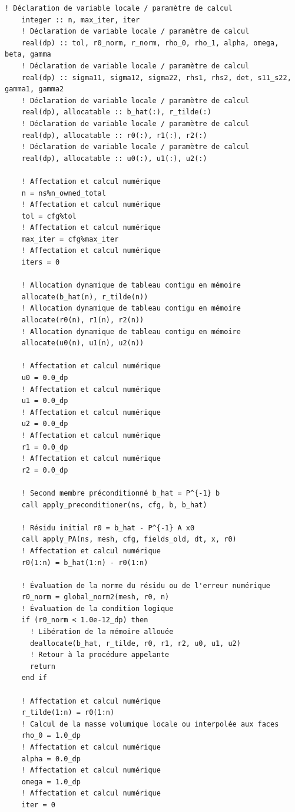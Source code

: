 \documentclass[10pt,a4paper,oneside]{book}
\begin{document}
\begin{lstlisting}[language={[95]Fortran}]
    ! Déclaration de variable locale / paramètre de calcul
    integer :: n, max_iter, iter
    ! Déclaration de variable locale / paramètre de calcul
    real(dp) :: tol, r0_norm, r_norm, rho_0, rho_1, alpha, omega, beta, gamma
    ! Déclaration de variable locale / paramètre de calcul
    real(dp) :: sigma11, sigma12, sigma22, rhs1, rhs2, det, s11_s22, gamma1, gamma2
    ! Déclaration de variable locale / paramètre de calcul
    real(dp), allocatable :: b_hat(:), r_tilde(:)
    ! Déclaration de variable locale / paramètre de calcul
    real(dp), allocatable :: r0(:), r1(:), r2(:)
    ! Déclaration de variable locale / paramètre de calcul
    real(dp), allocatable :: u0(:), u1(:), u2(:)

    ! Affectation et calcul numérique
    n = ns%n_owned_total
    ! Affectation et calcul numérique
    tol = cfg%tol
    ! Affectation et calcul numérique
    max_iter = cfg%max_iter
    ! Affectation et calcul numérique
    iters = 0

    ! Allocation dynamique de tableau contigu en mémoire
    allocate(b_hat(n), r_tilde(n))
    ! Allocation dynamique de tableau contigu en mémoire
    allocate(r0(n), r1(n), r2(n))
    ! Allocation dynamique de tableau contigu en mémoire
    allocate(u0(n), u1(n), u2(n))

    ! Affectation et calcul numérique
    u0 = 0.0_dp
    ! Affectation et calcul numérique
    u1 = 0.0_dp
    ! Affectation et calcul numérique
    u2 = 0.0_dp
    ! Affectation et calcul numérique
    r1 = 0.0_dp
    ! Affectation et calcul numérique
    r2 = 0.0_dp

    ! Second membre préconditionné b_hat = P^{-1} b
    call apply_preconditioner(ns, cfg, b, b_hat)

    ! Résidu initial r0 = b_hat - P^{-1} A x0
    call apply_PA(ns, mesh, cfg, fields_old, dt, x, r0)
    ! Affectation et calcul numérique
    r0(1:n) = b_hat(1:n) - r0(1:n)

    ! Évaluation de la norme du résidu ou de l'erreur numérique
    r0_norm = global_norm2(mesh, r0, n)
    ! Évaluation de la condition logique
    if (r0_norm < 1.0e-12_dp) then
      ! Libération de la mémoire allouée
      deallocate(b_hat, r_tilde, r0, r1, r2, u0, u1, u2)
      ! Retour à la procédure appelante
      return
    end if

    ! Affectation et calcul numérique
    r_tilde(1:n) = r0(1:n)
    ! Calcul de la masse volumique locale ou interpolée aux faces
    rho_0 = 1.0_dp
    ! Affectation et calcul numérique
    alpha = 0.0_dp
    ! Affectation et calcul numérique
    omega = 1.0_dp
    ! Affectation et calcul numérique
    iter = 0


\end{lstlisting}
\end{document}
